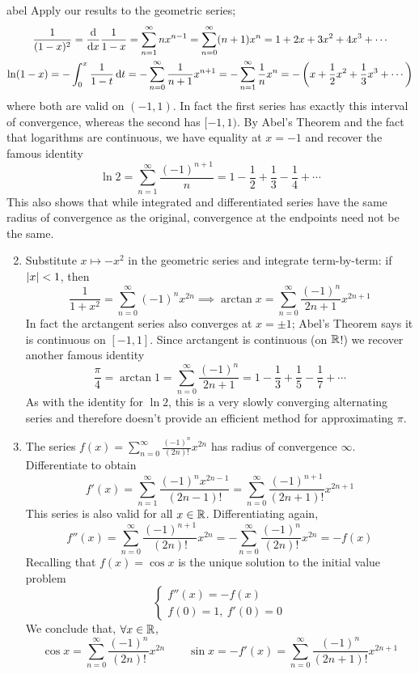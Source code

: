 \begin{examples}{}{abel}
	\exstart{}\label{ex:abel1} Apply our results to the geometric series;
	\begin{gather*}
		\frac 1{(1-x)^2}=\frac{\mathrm{d} }{\mathrm{d} x}\frac 1{1-x}=\sum_{n=1}^\infty nx^{n-1}=\sum_{n=0}^\infty (n+1)x^n=1+2x+3x^2+4x^3+\cdots\\
		\ln(1-x)=-\int_0^x\frac 1{1-t}\,{\mathrm{d} t}= -\sum_{n=0}^\infty\frac 1{n+1}x^{n+1}
	  =-\sum_{n=1}^\infty \frac 1nx^n=-\left(x+\frac 12x^2+\frac 13x^3+\cdots\right)
	\end{gather*}
	where both are valid on $(-1,1)$. In fact the first series has exactly this interval of convergence, whereas the second has $[-1,1)$. By Abel's Theorem and the fact that logarithms are continuous, we have equality at $x=-1$ and recover the famous identity
	\[
		\ln 2=\sum_{n=1}^\infty \frac{(-1)^{n+1}}{n}=1-\frac 12+\frac 13-\frac 14+\cdots
	\]
	This also shows that while integrated and differentiated series have the same radius of convergence as the original, convergence at the endpoints need not be the same.
		
	\begin{enumerate}\setcounter{enumi}{1}  
		\item Substitute $x\mapsto -x^2$ in the geometric series and integrate term-by-term: if $\left| x\right|<1$, then
		\[
			\frac 1{1+x^2}=\sum_{n=0}^\infty(-1)^nx^{2n} 
			\implies  \arctan x=\sum_{n=0}^\infty\frac{(-1)^n}{2n+1}x^{2n+1}
		\]
		In fact the arctangent series also converges at $x=\pm 1$; Abel's Theorem says it is continuous on $[-1,1]$. Since arctangent is continuous (on $\mathbb{R}$!) we recover another famous identity
		\[
			\frac\pi 4=\arctan 1
			=\sum_{n=0}^\infty\frac{(-1)^n}{2n+1}
			=1-\frac 13+\frac 15-\frac 17+\cdots
		\]
		As with the identity for $\ln 2$, this is a very slowly converging alternating series and therefore doesn't provide an efficient method for approximating $\pi$.
	  
	  \item\label{ex:abel3} The series $\displaystyle f(x)=\sum_{n=0}^\infty \frac{(-1)^n}{(2n)!}x^{2n}$ has radius of convergence $\infty$. Differentiate to obtain
		\[
			f'(x)=\sum_{n=1}^\infty \frac{(-1)^nx^{2n-1}}{(2n-1)!}
			=\sum_{n=0}^\infty \frac{(-1)^{n+1}}{(2n+1)!}x^{2n+1}
		\]
		This series is also valid for all $x\in\mathbb{R}$. Differentiating again,
		\[
			f''(x)=\sum_{n=0}^\infty \frac{(-1)^{n+1}}{(2n)!}x^{2n}
			=-\sum_{n=0}^\infty \frac{(-1)^n}{(2n)!}x^{2n}=-f(x)
		\]
		Recalling that $f(x)=\cos x$ is the unique solution to the initial value problem
		\[
			\begin{cases}
				f''(x)=-f(x)\\
				f(0)=1,\ f'(0)=0
			\end{cases}
		\]
		We conclude that, $\forall x\in\mathbb{R}$,
		\[
			\cos x=\sum_{n=0}^\infty \frac{(-1)^n}{(2n)!}x^{2n} 
			\qquad 
			\sin x=-f'(x)=\sum_{n=0}^\infty \frac{(-1)^n}{(2n+1)!}x^{2n+1}
		\]
	\end{enumerate}
\end{examples}


